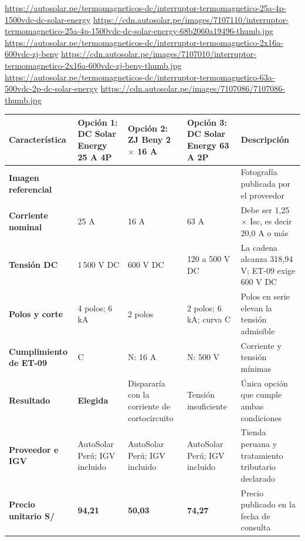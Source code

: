 \begin{landscape}
\urldef{\cotuw}\url{https://autosolar.pe/termomagneticos-dc/interruptor-termomagnetico-25a-4p-1500vdc-dc-solar-energy}
\urldef{\cotux}\url{https://cdn.autosolar.pe/images/7107110/interruptor-termomagnetico-25a-4p-1500vdc-dc-solar-energy-68b2060a19496-thumb.jpg}
\urldef{\cotuy}\url{https://autosolar.pe/termomagneticos-dc/interruptor-termomagnetico-2x16a-600vdc-zj-beny}
\urldef{\cotuz}\url{https://cdn.autosolar.pe/images/7107010/interruptor-termomagnetico-2x16a-600vdc-zj-beny-thumb.jpg}
\urldef{\cotuaa}\url{https://autosolar.pe/termomagneticos-dc/interruptor-termomagnetico-63a-500vdc-2p-dc-solar-energy}
\urldef{\cotuab}\url{https://cdn.autosolar.pe/images/7107086/7107086-thumb.jpg}
\par\noindent\begin{minipage}{\linewidth}\formatofichas
{}\label{tab:cot-sdc}
\begin{tabularx}{\linewidth}{@{}>{\raggedright\arraybackslash}p{3.0cm}YYY>{\raggedright\arraybackslash}p{4.4cm}@{}}
\toprule
\textbf{Característica} & \textbf{Opción 1: DC Solar Energy 25 A 4P} & \textbf{Opción 2: ZJ Beny 2 $\times$ 16 A} & \textbf{Opción 3: DC Solar Energy 63 A 2P} & \textbf{Descripción}\\\midrule
\textbf{Imagen referencial} &  &  &  & Fotografía publicada por el proveedor\\
\textbf{Corriente nominal} & 25 A & 16 A & 63 A & Debe ser 1,25 $\times$ Isc, es decir 20,0 A o más\\
\textbf{Tensión DC} & 1\,500 V DC & 600 V DC & 120 a 500 V DC & La cadena alcanza 318,94 V; ET-09 exige 600 V DC\\
\textbf{Polos y corte} & 4 polos; 6 kA & 2 polos & 2 polos; 6 kA; curva C & Polos en serie elevan la tensión admisible\\
\textbf{Cumplimiento de ET-09} & C & N: 16 A & N: 500 V & Corriente y tensión mínimas\\
\textbf{Resultado} & \textbf{Elegida} & Dispararía con la corriente de cortocircuito & Tensión insuficiente & Única opción que cumple ambas condiciones\\
\textbf{Proveedor e IGV} & AutoSolar Perú; IGV incluido & AutoSolar Perú; IGV incluido & AutoSolar Perú; IGV incluido & Tienda peruana y tratamiento tributario declarado\\
\textbf{Precio unitario S/} & \textbf{94,21} & \textbf{50,03} & \textbf{74,27} & Precio publicado en la fecha de consulta\\

\end{tabularx}
\end{minipage}
\end{landscape}
